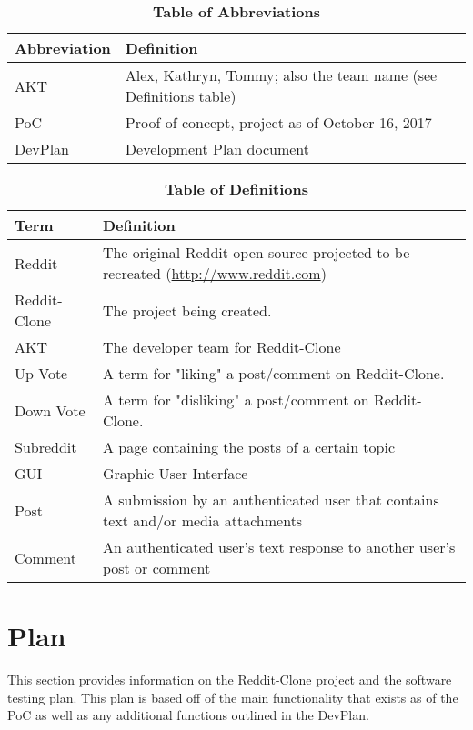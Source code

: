 \documentclass[12pt,fleqn]{article}
\begin{document}
\begin{table}[ht]
\caption{\textbf{Table of Abbreviations}} \label{Abbreviations}

\begin{tabularx}{\textwidth}{p{3cm}X}
\toprule
\textbf{Abbreviation} & \textbf{Definition} \\
\midrule
AKT & Alex, Kathryn, Tommy; also the team name (see Definitions table)\\
PoC & Proof of concept, project as of October 16, 2017\\
DevPlan & Development Plan document \\

\bottomrule
\end{tabularx}

\end{table}

\begin{table}[ht]
\caption{\textbf{Table of Definitions}} \label{Definitions}

\begin{tabularx}{\textwidth}{p{3cm}X}
\toprule
\textbf{Term} & \textbf{Definition}\\
\midrule
Reddit & The original Reddit open source projected to be recreated (\url{http://www.reddit.com})\\
Reddit-Clone & The project being created.\\
AKT & The developer team for Reddit-Clone\\
Up Vote & A term for "liking" a post/comment on Reddit-Clone.  \\
Down Vote & A term for "disliking" a post/comment on Reddit-Clone. \\
Subreddit & A page containing the posts of a certain topic \\
GUI & Graphic User Interface \\ 
Post & A submission by an authenticated user that contains text and/or media attachments \\
Comment & An authenticated user's text response to another user's post or comment \\
\bottomrule
\end{tabularx}

\end{table}	

\pagebreak
\section {Plan}
This section provides information on the Reddit-Clone project and the software testing plan. This plan is based off of the main functionality that exists as of the PoC as well as any additional functions outlined in the DevPlan.
\end{document}
